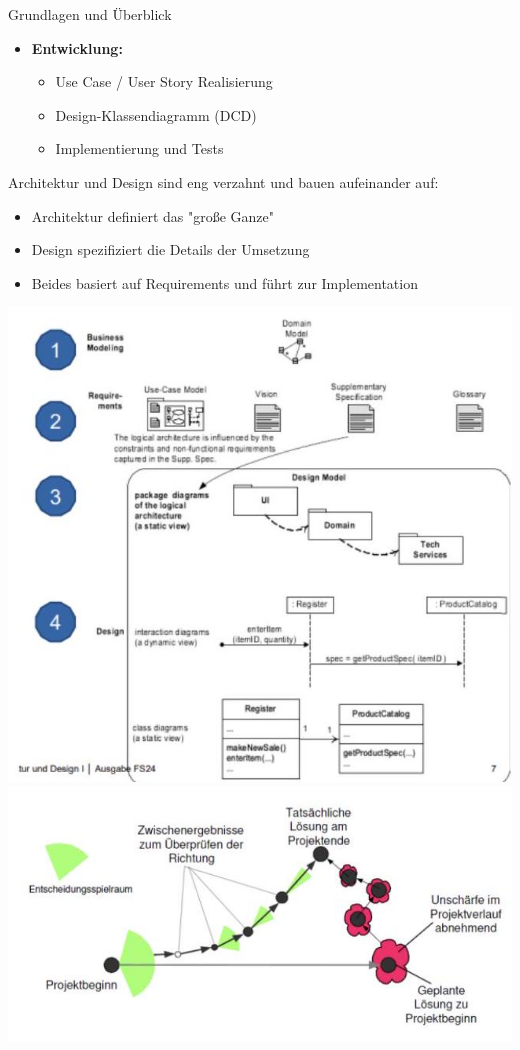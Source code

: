\begin{concept}{Grundlagen und Überblick}
\begin{itemize}
    \item \textbf{Entwicklung:}
    \begin{itemize}
        \item Use Case / User Story Realisierung
        \item Design-Klassendiagramm (DCD)
        \item Implementierung und Tests
    \end{itemize}
\end{itemize}
Architektur und Design sind eng verzahnt und bauen aufeinander auf:
\begin{itemize}
    \item Architektur definiert das "große Ganze"
    \item Design spezifiziert die Details der Umsetzung
    \item Beides basiert auf Requirements und führt zur Implementation
\end{itemize}
\includegraphics[width=\linewidth]{images/2024_12_29_0d1d7b5551ea1b4b41bdg-07(2)}
\includegraphics[width=\linewidth]{images/2024_12_29_0d1d7b5551ea1b4b41bdg-08(1)}
\end{concept}

